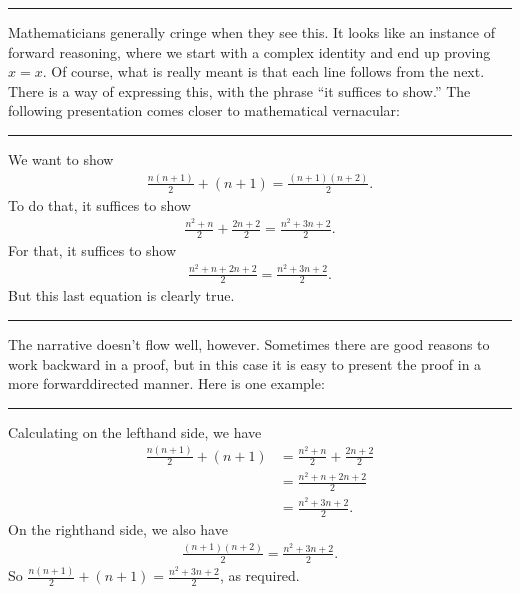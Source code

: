 \documentclass[letterpaper,10pt,english]{sphinxmanual}
\begin{document}
\bigskip\hrule\bigskip


\sphinxAtStartPar
Mathematicians generally cringe when they see this.  It looks like an instance of forward reasoning, where we start with a complex identity and end up proving \(x = x\). Of course, what is really meant is that each line follows from the next. There is a way of expressing this, with the phrase “it suffices to show.” The following presentation comes closer to mathematical vernacular:


\bigskip\hrule\bigskip


\sphinxAtStartPar
{} We want to show
\begin{equation*}
\begin{split}\frac{n(n+1)}{2} + (n + 1) = \frac{(n+1)(n+2)}{2}.\end{split}
\end{equation*}
\sphinxAtStartPar
To do that, it suffices to show
\begin{equation*}
\begin{split}\frac{n^2+n}{2} + \frac{2n + 2}{2} = \frac{n^2 + 3n + 2}{2}.\end{split}
\end{equation*}
\sphinxAtStartPar
For that, it suffices to show
\begin{equation*}
\begin{split}\frac{n^2+n + 2n + 2}{2} = \frac{n^2 + 3n + 2}{2}.\end{split}
\end{equation*}
\sphinxAtStartPar
But this last equation is clearly true.


\bigskip\hrule\bigskip


\sphinxAtStartPar
The narrative doesn’t flow well, however. Sometimes there are good reasons to work backward in a proof, but in this case it is easy to present the proof in a more forward\sphinxhyphen{}directed manner. Here is one example:


\bigskip\hrule\bigskip


\sphinxAtStartPar
{} Calculating on the left\sphinxhyphen{}hand side, we have
\begin{equation*}
\begin{split}\frac{n(n+1)}{2} + (n + 1) & = \frac{n^2+n}{2} + \frac{2n + 2}{2} \\
  & = \frac{n^2+n + 2n + 2}{2} \\
  & = \frac{n^2 + 3n + 2}{2}.\end{split}
\end{equation*}
\sphinxAtStartPar
On the right\sphinxhyphen{}hand side, we also have
\begin{equation*}
\begin{split}\frac{(n+1)(n+2)}{2} = \frac{n^2 + 3n + 2}{2}.\end{split}
\end{equation*}
\sphinxAtStartPar
So \(\frac{n(n+1)}{2} + (n + 1) = \frac{n^2 + 3n + 2}{2}\), as required.
\end{document}
